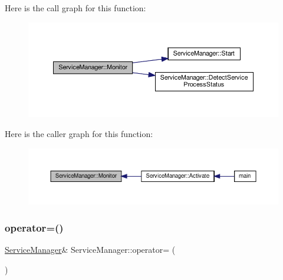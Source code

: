 Here is the call graph for this function\+:
\nopagebreak
\begin{figure}[H]
\begin{center}
\leavevmode
\includegraphics[width=350pt]{classServiceManager_a88f70377d5303fe8ddf0c09a31f52685_cgraph}
\end{center}
\end{figure}
Here is the caller graph for this function\+:
\nopagebreak
\begin{figure}[H]
\begin{center}
\leavevmode
\includegraphics[width=350pt]{classServiceManager_a88f70377d5303fe8ddf0c09a31f52685_icgraph}
\end{center}
\end{figure}
\mbox{\label{classServiceManager_a7c9eec262e4a561a78ecf161b0d7eb5a}} 
\subsubsection{\texorpdfstring{operator=()}{operator=()}\hspace{0.1cm}{\footnotesize\ttfamily [1/2]}}
{\footnotesize\ttfamily \hyperlink{classServiceManager}{Service\+Manager}\& Service\+Manager\+::operator= (\begin{DoxyParamCaption}\item[{\hyperlink{classServiceManager}{Service\+Manager} const \&}]{ }\end{DoxyParamCaption})\hspace{0.3cm}{\ttfamily [delete]}}

\mbox{\label{classServiceManager_a74f02128751d290a31a4cc73cf3a26ff}} 

